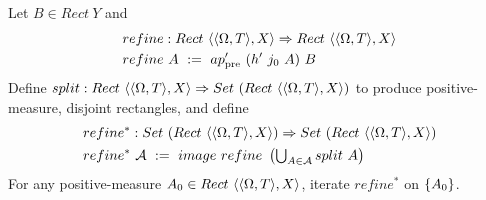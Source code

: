 \begin{definition}
\label{def:preimage-refinement}
Let $B \in Rect~Y$ and
\begin{equation}
\begin{aligned}
	&refine : Rect~\langle{\langle{\Omega,T}\rangle,X}\rangle \Rightarrow Rect~\langle{\langle{\Omega,T}\rangle,X}\rangle \\
	&refine~A\ :=\ ap_\mathrm{pre}'~(h'~j_0~A)~B
\end{aligned}
\end{equation}
Define $split : Rect~\langle{\langle{\Omega,T}\rangle,X}\rangle \Rightarrow Set~(Rect~\langle{\langle{\Omega,T}\rangle,X}\rangle)$ to produce positive-measure, disjoint rectangles, and define
\begin{equation}
\begin{aligned}
	&refine^* : Set~(Rect~\langle{\langle{\Omega,T}\rangle,X}\rangle) \Rightarrow Set~(Rect~\langle{\langle{\Omega,T}\rangle,X}\rangle) \\
	&refine^*~\mathcal{A}\ :=\ image~refine~\left(\textstyle\bigcup_{A \in \mathcal{A}} split~A \right)
\end{aligned}
\end{equation}
For any positive-measure $A_0 \in Rect~\langle{\langle{\Omega,T}\rangle,X}\rangle$, iterate $refine^*$ on $\{{A_0}\}$.
\end{definition}

\newcommand{\betweenrefinementfigurehspace}{\hspace{0.07in}}
\newcommand{\subfigurewidth}{2.05in}

